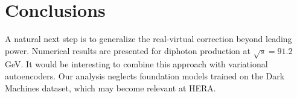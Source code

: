 \section{Conclusions}\label{sec:conclusions}

A natural next step is to generalize the real-virtual correction beyond
leading power. Numerical results are presented for diphoton production
at $\sqrt{s} = 91.2$ GeV. It would be interesting to combine this
approach with variational autoencoders. Our analysis neglects foundation
models trained on the Dark Machines dataset, which may become relevant
at HERA.

